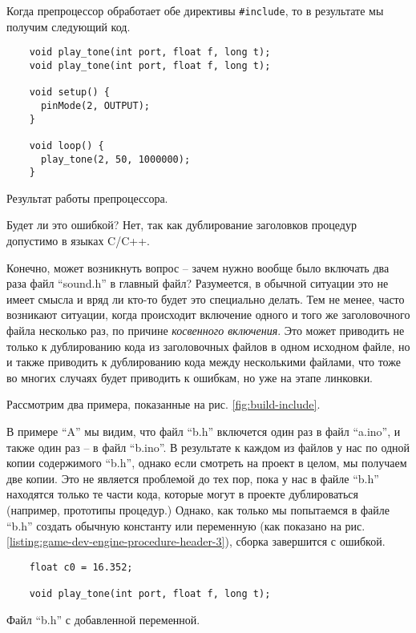 \documentclass[../sparc.tex]{subfiles}
\begin{document}
Когда препроцессор обработает обе директивы \texttt{#include}, то в
результате мы получим следующий код.

\begin{listing}[H]
  \begin{verbatim}
    void play_tone(int port, float f, long t);
    void play_tone(int port, float f, long t);

    void setup() {
      pinMode(2, OUTPUT);
    }

    void loop() {
      play_tone(2, 50, 1000000);
    }
  \end{verbatim}
  \label{listing:game-dev-engine-procedure-header-include-2}
  \caption{Результат работы препроцессора.}
\end{listing}

Будет ли это ошибкой?  Нет, так как дублирование заголовков процедур допустимо в
языках C/C++.

Конечно, может возникнуть вопрос -- зачем нужно вообще было включать два раза
файл ``sound.h'' в главный файл?  Разумеется, в обычной ситуации это не имеет
смысла и вряд ли кто-то будет это специально делать.  Тем не менее, часто
возникают ситуации, когда происходит включение одного и того же заголовочного
файла несколько раз, по причине \emph{косвенного включения}.  Это может
приводить не только к дублированию кода из заголовочных файлов в одном исходном
файле, но и также приводить к дублированию кода между несколькими файлами, что
тоже во многих случаях будет приводить к ошибкам, но уже на этапе линковки.

Рассмотрим два примера, показанные на рис. \ref{fig:build-include}.


В примере ``A'' мы видим, что файл ``b.h'' включется один раз в файл ``a.ino'',
и также один раз -- в файл ``b.ino''.  В результате к каждом из файлов у нас по
одной копии содержимого ``b.h'', однако если смотреть на проект в целом, мы
получаем две копии.  Это не является проблемой до тех пор, пока у нас в файле
``b.h'' находятся только те части кода, которые могут в проекте дублироваться
(например, прототипы процедур.)  Однако, как только мы попытаемся в файле
``b.h'' создать обычную константу или переменную (как показано на
рис. \ref{listing:game-dev-engine-procedure-header-3}), сборка завершится с
ошибкой.

\begin{listing}[H]
  \begin{verbatim}
    float c0 = 16.352;

    void play_tone(int port, float f, long t);
  \end{verbatim}
  \label{listing:game-dev-engine-procedure-header-3}
  \caption{Файл ``b.h'' с добавленной переменной.}
\end{listing}
\end{document}
